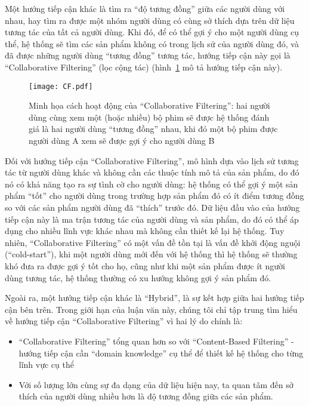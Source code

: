 Một hướng tiếp cận khác là tìm ra ``độ tương đồng'' giữa các người dùng với nhau, hay tìm ra được một nhóm người dùng
có cùng sở thích dựa trên dữ liệu tương tác của tất cả người dùng. Khi đó, để có thể gợi ý cho một người dùng cụ thể,
hệ thống sẽ tìm các sản phẩm không có trong lịch sử của người dùng đó, và đã được những người dùng ``tương đồng'' tương tác,
hướng tiếp cận này gọi là ``Collaborative Filtering'' (lọc cộng tác) (hình~\ref{fig_CF} mô tả hướng tiếp cận này).
\begin{figure}
    \centering
    \texttt{[image: CF.pdf]}
    \caption{Minh họa cách hoạt động của ``Collaborative Filtering'': hai người dùng cùng xem một (hoặc nhiều) bộ phim 
    sẽ được hệ thống đánh giá là hai người dùng ``tương đồng'' nhau, khi đó một bộ phim được
    người dùng A xem sẽ được gợi ý cho người dùng B}
    \label{fig_CF}
\end{figure}
Đối với hướng tiếp cận ``Collaborative Filtering'', mô hình dựa vào lịch sử tương tác từ người dùng khác
và không cần các thuộc tính mô tả của sản phẩm, do đó nó có khả năng tạo ra sự tình cờ cho người dùng:
hệ thống có thể gợi ý một sản phẩm ``tốt'' cho người dùng trong trường hợp sản phẩm đó có ít điểm tương đồng
so với các sản phẩm người dùng đã ``thích'' trước đó. Dữ liệu đầu vào của hướng tiếp cận này là ma trận tương tác
của người dùng và sản phẩm, do đó có thể áp dụng cho nhiều lĩnh vực khác nhau mà không cần thiết kế lại hệ thống.
Tuy nhiên, ``Collaborative Filtering'' có một vấn đề tồn tại là vấn đề khởi động nguội (``cold-start''),
khi một người dùng mới đến với hệ thống thì hệ thống sẽ thường khó đưa ra được gợi ý tốt cho họ,
cũng như khi một sản phẩm được ít người dùng tương tác, hệ thống thường có xu hướng không gợi ý sản phẩm đó.

Ngoài ra, một hướng tiếp cận khác là ``Hybrid'', là sự kết hợp giữa hai hướng tiếp cận bên trên.
Trong giới hạn của luận văn này, chúng tôi chỉ tập trung tìm hiểu về hướng tiếp cận ``Collaborative Filtering'' 
vì hai lý do chính là:
\begin{itemize}
\item ``Collaborative Filtering'' tổng quan hơn so với ``Content-Based Filtering''
- hướng tiếp cận cần ``domain knowledge'' cụ thể để thiết kế hệ thống cho từng lĩnh vực cụ thể
\item Với số lượng lớn cùng sự đa dạng của dữ liệu hiện nay,
ta quan tâm đến sở thích của người dùng nhiều hơn là độ tương đồng giữa các sản phẩm.

\end{itemize}

